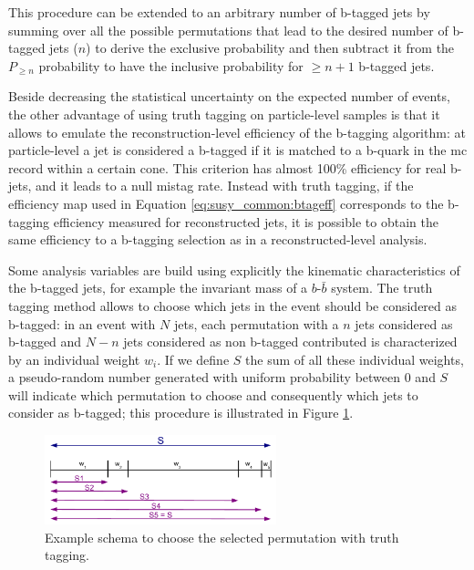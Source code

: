 \noindent This procedure can be extended to an arbitrary number of b-tagged jets by summing over all the possible permutations that lead to the desired number of b-tagged jets ($n$) to derive the exclusive probability and then subtract it from the $P_{\geq n}$ probability to have the inclusive probability for $\geq n+1$ b-tagged jets.
 
Beside decreasing the statistical uncertainty on the expected number of events, the other advantage of using truth tagging on particle-level samples is that it allows to emulate the reconstruction-level efficiency of the b-tagging algorithm: 
at particle-level a jet is considered a b-tagged if it is matched to a b-quark in the \gls{mc} record within a certain cone. This criterion has 
almost 100\% efficiency for real b-jets, and it leads to a null mistag rate. Instead with truth tagging, if the efficiency map used in Equation \ref{eq:susy_common:btageff} corresponds to the b-tagging efficiency measured for reconstructed jets, 
it is possible to obtain the same efficiency to a b-tagging selection as in a reconstructed-level analysis. 

Some analysis variables are build using explicitly the kinematic characteristics of the b-tagged jets, for example the invariant mass of a $b$-$\bar{b}$ system. The truth tagging method allows to choose which jets in the event should be considered as b-tagged: in an event with $N$ jets, each permutation with a $n$ jets considered as b-tagged and $N-n$ jets considered as non b-tagged contributed is characterized by an individual weight $w_i$. If we define $S$ the sum of all these individual weights, a pseudo-random number generated with uniform probability between 0 and $S$ will indicate which permutation to choose and consequently which jets to consider as b-tagged; this procedure is illustrated in Figure \ref{fig:susy_common_trf_perm}. 

\begin{figure}[h]
\centering 
\includegraphics[width=0.6\textwidth]{figures/susy_common/trf_perm}
\caption{Example schema to choose the selected permutation with truth tagging.}\label{fig:susy_common_trf_perm}
\end{figure}


